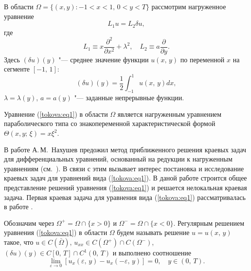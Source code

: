 
\date{08/XI/2010}



\maketitle


В области $\Omega=\{(x,y): -1<x<1,\,0<y<T \}$ рассмотрим нагруженное уравнение
\begin{equation}
\label{tokova:eq1}
L_1 u=L_2 \delta u,
\end{equation}
где
\[
L_1 \equiv x \frac{\partial^2}{\partial x^2} + \lambda^2, \quad L_2 \equiv a \frac{\partial}{\partial y}.
\]
Здесь
$(\delta u )(y)$ "--- среднее значение функции $u(x,\,y)$ по переменной $x$ на сегменте 
$[-1,\,1]$:
$$
(\delta u )(y)=\frac{1}{2}\int _{-1}^{1} u(x,\,y)dx,
$$
$\lambda=\lambda(y)$, $a=a(y)$ "--- заданные непрерывные функции.

Уравнение (\ref{tokova:eq1}) в области $\Omega$ является нагруженным уравнением параболического типа
со знакопеременной характеристической формой  $\Theta(x,y;\,\xi)=x \xi^{2}$.

В работе \cite{nakhushev-du82} А.\,М.~Нахушев предожил метод приближенного решения
краевых задач для дифференциальных
уравнений, основанный на редукции к нагруженным уравнениям
(см.~\cite{nakhushev-du76}).
В связи с этим вызывает интерес постановка и исследование краевых задач
для уравнений вида (\ref{tokova:eq1}).
В даной работе строится общее представление решений уравнения (\ref{tokova:eq1}) и решается
нелокальная краевая задача.
Первая краевая задача для уравнения вида (\ref{tokova:eq1})
рассматривалась в работе \cite{tok5}.

Обозначим через $\Omega^{+}=\Omega \cap \{x>0\}$ и $\Omega^{-}=\Omega \cap\{x<0\}$. Регулярным решением уравнения (\ref{tokova:eq1}) в
области $\Omega$ будем
называть решение $u=u(x,\,y)$ такое, что $u\in C(\bar\Omega)$, $u_{xx} \in C(\Omega^{+})\cap C(\Omega^{-})$, $(\delta u)(y) \in C
[0,\,T] \cap C^1(0,\,T)$ и выполнено соотношение
\[
\lim_{\varepsilon \rightarrow 0} [u_x(\varepsilon,\,y)-u_x(-\varepsilon,\,y)]=0,\quad y\in(0,\,T).
\]

\smallskip

